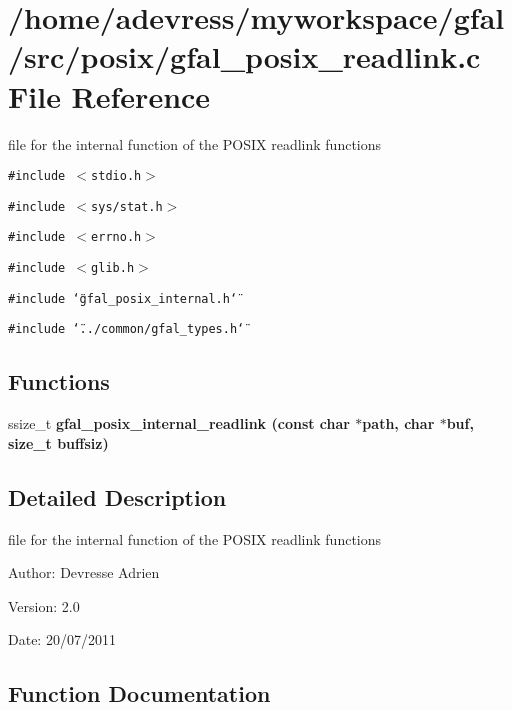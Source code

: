 \section{/home/adevress/myworkspace/gfal/src/posix/gfal\_\-posix\_\-readlink.c File Reference}
\label{gfal__posix__readlink_8c}
file for the internal function of the POSIX readlink functions 

{\tt \#include $<$stdio.h$>$}\par
{\tt \#include $<$sys/stat.h$>$}\par
{\tt \#include $<$errno.h$>$}\par
{\tt \#include $<$glib.h$>$}\par
{\tt \#include \char`\"{}gfal\_\-posix\_\-internal.h\char`\"{}}\par
{\tt \#include \char`\"{}../common/gfal\_\-types.h\char`\"{}}\par
\subsection*{Functions}
\begin{CompactItemize}
\item 
ssize\_\-t \bf{gfal\_\-posix\_\-internal\_\-readlink} (const char $\ast$path, char $\ast$buf, size\_\-t buffsiz)
\end{CompactItemize}


\subsection{Detailed Description}
file for the internal function of the POSIX readlink functions 

\begin{Desc}
\item[Author:]Devresse Adrien \end{Desc}
\begin{Desc}
\item[Version:]2.0 \end{Desc}
\begin{Desc}
\item[Date:]20/07/2011 \end{Desc}


\subsection{Function Documentation}
